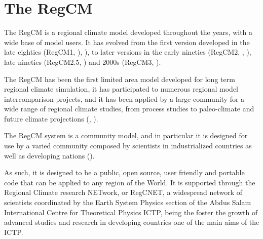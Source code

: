 
\chapter{The \ac{RegCM}}

The \ac{RegCM} is a regional climate model developed throughout the years,
with a wide base of model users. It has evolved from the first version
developed in the late eighties (\ac{RegCM}1, \cite{Dickinson_89}),
\cite{Giorgi_90}), to later versions in the early nineties (\ac{RegCM}2,
\cite{Giorgi_93b}, \cite{Giorgi_93c}), late nineties (\ac{RegCM}2.5,
\cite{Giorgi_99}) and 2000s (\ac{RegCM}3, \cite{Pal_00}).

The \ac{RegCM} has been the first limited area model
developed for long term regional climate simulation, it has participated to
numerous regional model intercomparison projects, and it has been applied by
a large community for a wide range of regional climate studies, from process
studies to paleo-climate and future climate projections (\cite{Giorgi_99},
\cite{Giorgi_06}).

The \ac{RegCM} system is a community model, and in particular it is designed
for use by a varied community composed by scientists in industrialized
countries as well as developing nations (\cite{Pal_07}).

As such, it is designed to be a public, open source, user friendly and portable
code that can be applied to any region of the World. It is supported through
the Regional Climate research NETwork, or RegCNET, a widespread network of
scientists coordinated by the Earth System Physics section of
the Abdus Salam International Centre for Theoretical Physics \ac{ICTP},
being the foster the growth of advanced studies and research in developing
countries one of the main aims of the \ac{ICTP}.

